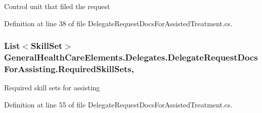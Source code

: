 Control unit that filed the request 



Definition at line 38 of file Delegate\+Request\+Docs\+For\+Assisted\+Treatment.\+cs.

\subsubsection[{\texorpdfstring{Required\+Skill\+Sets}{RequiredSkillSets}}]{\setlength{\rightskip}{0pt plus 5cm}List$<${\bf Skill\+Set}$>$ General\+Health\+Care\+Elements.\+Delegates.\+Delegate\+Request\+Docs\+For\+Assisting.\+Required\+Skill\+Sets\hspace{0.3cm}{\ttfamily [get]}, {\ttfamily [set]}}\hypertarget{class_general_health_care_elements_1_1_delegates_1_1_delegate_request_docs_for_assisting_a3d902f2bd7c0d6893b824e46c90409ce}{}\label{class_general_health_care_elements_1_1_delegates_1_1_delegate_request_docs_for_assisting_a3d902f2bd7c0d6893b824e46c90409ce}


Required skill sets for assisting 



Definition at line 55 of file Delegate\+Request\+Docs\+For\+Assisted\+Treatment.\+cs.

